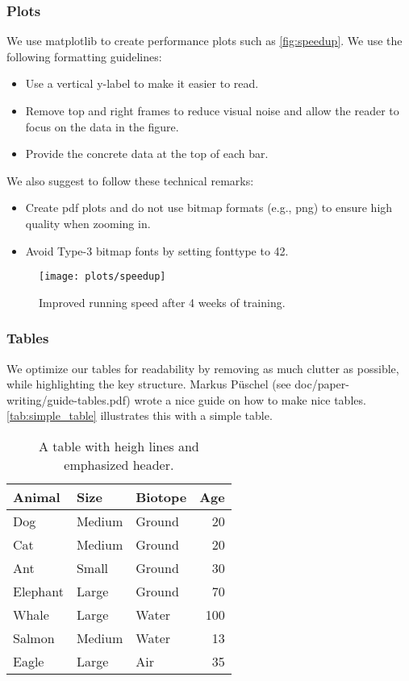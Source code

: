 \documentclass[review, anonymous, acmsmall, screen]{acmart}
\newenvironment{draftonly}{}{}
\newcommand{\ra}[1]{\renewcommand{\arraystretch}{#1}}
\begin{document}
\begin{draftonly}
\subsubsection{Plots} We use matplotlib to create performance
plots such as \autoref{fig:speedup}. We use the following
formatting guidelines:
\begin{itemize}
  \item Use a vertical y-label to make it easier to read.
  \item Remove top and right frames to reduce visual noise
	and allow the reader to focus on the data in the
	figure.
  \item Provide the concrete data at the top of each bar.
\end{itemize}

\noindent
We also suggest to follow these technical remarks:
\begin{itemize}
  \item Create pdf plots and do not use bitmap formats (e.g., png) to
	ensure high quality when zooming in.
  \item Avoid Type-3 bitmap fonts by
	setting fonttype to 42.
\end{itemize}

\begin{figure}
\texttt{[image: plots/speedup]}
\caption{Improved running speed after 4 weeks of training.
}
\label{fig:speedup}
\end{figure}

\subsubsection{Tables} We optimize our tables for readability by removing as
much clutter as possible, while highlighting the key structure. Markus Püschel
(see doc/paper-writing/guide-tables.pdf) wrote a nice guide on how to make nice
tables. \autoref{tab:simple_table} illustrates this with a simple
table.

\begin{table}
\ra{1.2}
\centering
\begin{tabular}{l l l r}
  \toprule
  \textbf{Animal} & \textbf{Size} & \textbf{Biotope} & \textbf{Age}\\
  \midrule
  Dog & Medium & Ground & 20\\
  Cat & Medium & Ground &20 \\
  Ant & Small & Ground & 30 \\
  Elephant & Large & Ground & 70\\
  Whale & Large & Water & 100\\
  Salmon & Medium & Water & 13 \\
  Eagle & Large & Air & 35 \\
  \bottomrule
\end{tabular}
\vspace{1em}
\caption{A table with heigh lines and emphasized header.}
\label{tab:simple_table}
\end{table}


\end{draftonly}
\end{document}
